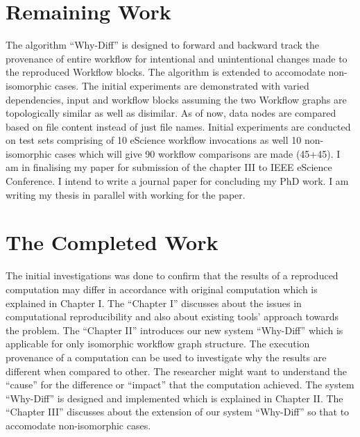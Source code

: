 \documentclass[10pt,conference,twocolumn]{IEEEtran}
\begin{document}
\section{Remaining Work}
The algorithm \enquote{Why-Diff} is designed to forward and backward track the provenance of entire workflow for intentional and unintentional changes made to the reproduced Workflow blocks. The algorithm is extended to accomodate non-isomorphic cases. The initial experiments are demonstrated with varied dependencies, input and workflow blocks assuming the two Workflow graphs are topologically similar as well as disimilar. As of now, data nodes are compared based on file content instead of just file names. Initial experiments are conducted on test sets comprising of 10 eScience workflow invocations as well 10 non-isomorphic cases which will give 90 workflow comparisons are made (45+45). I am in finalising my paper for submission of the chapter III to IEEE eScience Conference. I intend to write a journal paper for concluding my PhD work. I am writing my thesis in parallel with working for the paper.

\section{The Completed Work}
The initial investigations was done to confirm that the results of a reproduced computation may differ in accordance with original computation which is explained in Chapter I. The \enquote{Chapter I} discusses about the issues in computational reproducibility and also about existing tools' approach towards the problem.  The \enquote{Chapter II} introduces our new system \enquote{Why-Diff} which is applicable for only isomorphic workflow graph structure. The execution provenance of a computation can be used to investigate why the results are different when compared to other. The researcher might want to understand the \enquote{cause} for the difference or \enquote{impact} that the computation achieved. The system \enquote{Why-Diff} is designed and implemented which is explained in Chapter II. The \enquote{Chapter III} discusses about the extension of our system \enquote{Why-Diff} so that to accomodate non-isomorphic cases.
\end{document}
